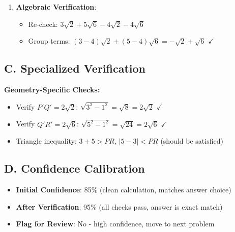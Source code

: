 \documentclass[]{article}
\begin{document}
\begin{verificationbox}
\begin{enumerate}[leftmargin=*]
    \item \textbf{Algebraic Verification}:
    \begin{itemize}
        \item Re-check: $3\sqrt{2} + 5\sqrt{6} - 4\sqrt{2} - 4\sqrt{6}$
        \item Group terms: $(3-4)\sqrt{2} + (5-4)\sqrt{6} = -\sqrt{2} + \sqrt{6}$ $\checkmark$
    \end{itemize}
\end{enumerate}

\subsection*{C. Specialized Verification}
\textbf{Geometry-Specific Checks:}
\begin{itemize}[leftmargin=*]
    \item Verify $P'Q' = 2\sqrt{2}$: $\sqrt{3^2 - 1^2} = \sqrt{8} = 2\sqrt{2}$ $\checkmark$
    \item Verify $Q'R' = 2\sqrt{6}$: $\sqrt{5^2 - 1^2} = \sqrt{24} = 2\sqrt{6}$ $\checkmark$
    \item Triangle inequality: $3 + 5 > PR$, $|5-3| < PR$ (should be satisfied)
\end{itemize}

\subsection*{D. Confidence Calibration}
\begin{itemize}[leftmargin=*]
    \item \textbf{Initial Confidence}: 85\% (clean calculation, matches answer choice)
    \item \textbf{After Verification}: 95\% (all checks pass, answer is exact match)
    \item \textbf{Flag for Review}: No - high confidence, move to next problem
\end{itemize}
\end{verificationbox}
\end{document}

